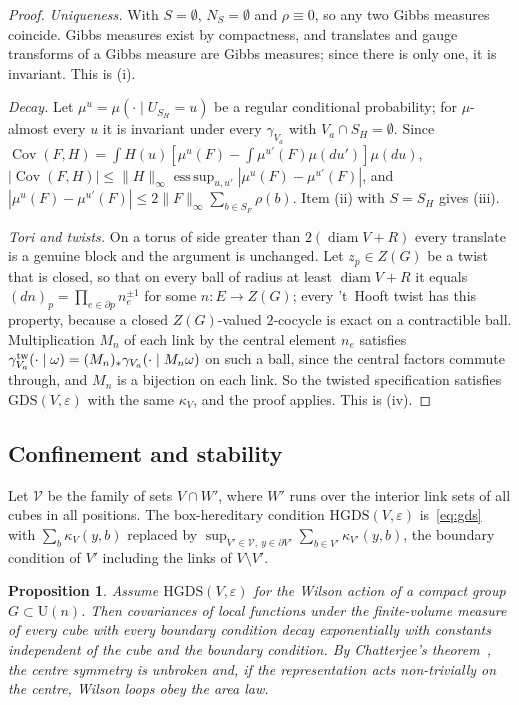 \documentclass[11pt]{amsart}
\newtheorem{proposition}[theorem]{Proposition}
\theoremstyle{definition}
\theoremstyle{remark}
\newcommand{\U}{\mathrm{U}}
\newcommand{\Cov}{\operatorname{Cov}}
\newcommand{\diam}{\operatorname{diam}}
\begin{document}
\begin{proof}
\emph{Uniqueness.} With $S=\emptyset$, $N_S=\emptyset$ and $\rho\equiv0$, so any
two Gibbs measures coincide. Gibbs measures exist by compactness, and
translates and gauge transforms of a Gibbs measure are Gibbs measures; since
there is only one, it is invariant. This is (i).

\emph{Decay.} Let $\mu^u=\mu(\cdot\mid U_{S_H}=u)$ be a regular conditional
probability; for $\mu$-almost every $u$ it is invariant under every
$\gamma_{V_a}$ with $V_a\cap S_H=\emptyset$. Since $\Cov(F,H)=\int H(u)
[\mu^u(F)-\int\mu^{u'}(F)\mu(du')]\mu(du)$,
$|\Cov(F,H)|\le\|H\|_\infty\operatorname{ess\,sup}_{u,u'}|\mu^u(F)-\mu^{u'}(F)|$,
and $|\mu^u(F)-\mu^{u'}(F)|\le2\|F\|_\infty\sum_{b\in S_F}\rho(b)$. Item (ii)
with $S=S_H$ gives (iii).

\emph{Tori and twists.} On a torus of side greater than $2(\diam V+R)$ every
translate is a genuine block and the argument is unchanged. Let $z_p\in Z(G)$ be
a twist that is closed, so that on every ball of radius at least $\diam V+R$ it
equals $(dn)_p=\prod_{e\in\partial p}n_e^{\pm1}$ for some $n\colon E\to Z(G)$;
every 't~Hooft twist has this property, because a closed $Z(G)$-valued
$2$-cocycle is exact on a contractible ball. Multiplication $M_n$ of each link by
the central element $n_e$ satisfies $\gamma^{\rm tw}_{V_a}(\cdot\mid\omega)=
(M_n)_*\gamma_{V_a}(\cdot\mid M_n\omega)$ on such a ball, since the central
factors commute through, and $M_n$ is a bijection on each link. So the twisted
specification satisfies $\mathrm{GDS}(V,\varepsilon)$ with the same $\kappa_V$,
and the proof applies. This is (iv).
\end{proof}

\subsection{Confinement and stability}

Let $\mathcal V$ be the family of sets $V\cap W'$, where $W'$ runs over the
interior link sets of all cubes in all positions. The box-hereditary condition
$\mathrm{HGDS}(V,\varepsilon)$ is~\eqref{eq:gds} with $\sum_b\kappa_V(y,b)$
replaced by $\sup_{V'\in\mathcal V,\ y\in\partial V'}\sum_{b\in V'}
\kappa_{V'}(y,b)$, the boundary condition of $V'$ including the links of
$V\setminus V'$.

\begin{proposition}\label{prop:hgds}
Assume $\mathrm{HGDS}(V,\varepsilon)$ for the Wilson action of a compact group
$G\subset\U(n)$. Then covariances of local functions under the finite-volume
measure of every cube with every boundary condition decay exponentially with
constants independent of the cube and the boundary condition. By
Chatterjee's theorem~\cite[Thm.~2.4]{Cha21}, the centre symmetry is unbroken
and, if the representation acts non-trivially on the centre, Wilson loops obey
the area law.
\end{proposition}
\end{document}

